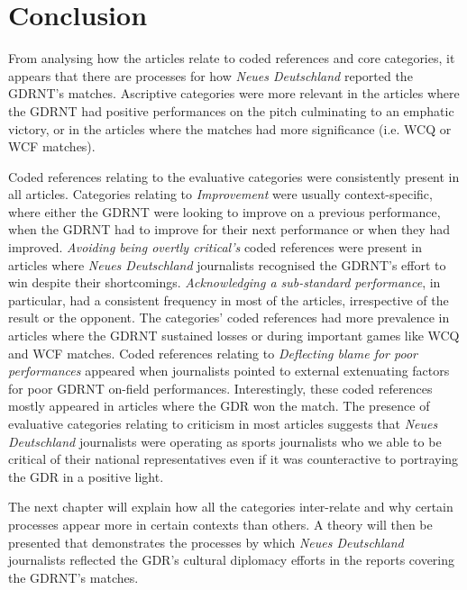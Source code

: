 \section*{Conclusion}

From analysing how the articles relate to coded references and core categories, it appears that there are processes for how \textit{Neues Deutschland} reported the GDRNT’s matches. Ascriptive categories were more relevant in the articles where the GDRNT had positive performances on the pitch culminating to an emphatic victory, or in the articles where the matches had more significance (i.e. WCQ or WCF matches).

Coded references relating to the evaluative categories were consistently present in all articles. Categories relating to \textit{Improvement} were usually context-specific, where either the GDRNT were looking to improve on a previous performance, when the GDRNT had to improve for their next performance or when they had improved. \textit{Avoiding being overtly critical’s} coded references were present in articles where \textit{Neues Deutschland} journalists recognised the GDRNT’s effort to win despite their shortcomings. \textit{Acknowledging a sub-standard performance}, in particular, had a consistent frequency in most of the articles, irrespective of the result or the opponent. The categories’ coded references had more prevalence in articles where the GDRNT sustained losses or during important games like WCQ and WCF matches. Coded references relating to \textit{Deflecting blame for poor performances} appeared when journalists pointed to external extenuating factors for poor GDRNT on-field performances. Interestingly, these coded references mostly appeared in articles where the GDR won the match. The presence of evaluative categories relating to criticism in most articles suggests that \textit{Neues Deutschland} journalists were operating as sports journalists who we able to be critical of their national representatives even if it was counteractive to portraying the GDR in a positive light.

The next chapter will explain how all the categories inter-relate and why certain processes appear more in certain contexts than others. A theory will then be presented that demonstrates the processes by which \textit{Neues Deutschland} journalists reflected the GDR’s cultural diplomacy efforts in the reports covering the GDRNT’s matches.
